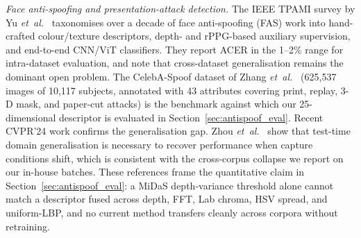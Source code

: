\documentclass{ieeeaccess}
\begin{document}
\emph{Face anti-spoofing and presentation-attack detection.} The IEEE TPAMI survey by Yu \emph{et~al.}~\cite{b21} taxonomises over a decade of face anti-spoofing (FAS) work into hand-crafted colour/texture descriptors, depth- and rPPG-based auxiliary supervision, and end-to-end CNN/ViT classifiers. They report ACER in the 1--2\% range for intra-dataset evaluation, and note that cross-dataset generalisation remains the dominant open problem. The CelebA-Spoof dataset of Zhang \emph{et~al.}~\cite{b22} (625{,}537 images of 10{,}117 subjects, annotated with 43 attributes covering print, replay, 3-D mask, and paper-cut attacks) is the benchmark against which our 25-dimensional descriptor is evaluated in Section~\ref{sec:antispoof_eval}. Recent CVPR'24 work confirms the generalisation gap. Zhou \emph{et~al.}~\cite{b23} show that test-time domain generalisation is necessary to recover performance when capture conditions shift, which is consistent with the cross-corpus collapse we report on our in-house batches. These references frame the quantitative claim in Section~\ref{sec:antispoof_eval}: a MiDaS depth-variance threshold alone cannot match a descriptor fused across depth, FFT, Lab chroma, HSV spread, and uniform-LBP, and no current method transfers cleanly across corpora without retraining.
\end{document}
